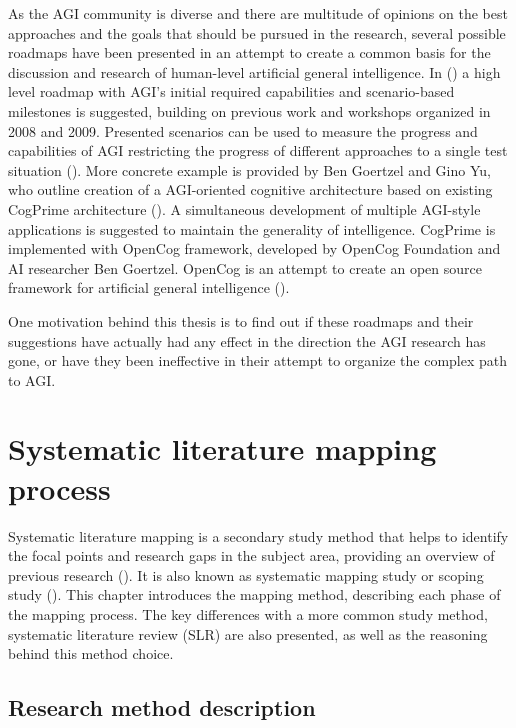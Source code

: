 \documentclass[utf8,english]{gradu3}
\begin{document}
As the AGI community is diverse and there are multitude of opinions on the best
approaches and the goals that should be pursued in the research, several
possible roadmaps have been presented in an attempt to create a common basis for
the discussion and research of human-level artificial general intelligence. In
(\cite{adams2012}) a high level roadmap with AGI's initial required capabilities
and scenario-based milestones is suggested, building on previous work and
workshops organized in 2008 and 2009. Presented scenarios can be used to measure
the progress and capabilities of AGI restricting the progress of different
approaches to a single test situation (\cite{adams2012}). More concrete example
is provided by Ben Goertzel and Gino Yu, who outline creation of a AGI-oriented
cognitive architecture based on existing CogPrime architecture
(\cite{goertzel2014map}). A simultaneous development of multiple AGI-style
applications is suggested to maintain the generality of intelligence. CogPrime
is implemented with OpenCog framework, developed by OpenCog Foundation and AI
researcher Ben Goertzel. OpenCog is an attempt to create an open source
framework for artificial general intelligence
(\cite{opencogwiki,goertzel2012cog}).

One motivation behind this thesis is to find out if these roadmaps and their
suggestions have actually had any effect in the direction the AGI research has
gone, or have they been ineffective in their attempt to organize the complex
path to AGI.


\chapter{Systematic literature mapping process}

\label{chap:method}

Systematic literature mapping is a secondary study method that helps to identify
the focal points and research gaps in the subject area, providing an overview of
previous research (\cite{petersen2008}). It is also known as systematic mapping
study or scoping study (\cite{kitchenham2007}). This chapter introduces the
mapping method, describing each phase of the mapping process. The key
differences with a more common study method, systematic literature review (SLR)
are also presented, as well as the reasoning behind this method choice.

\section{Research method description}
\label{method_description}
\end{document}
